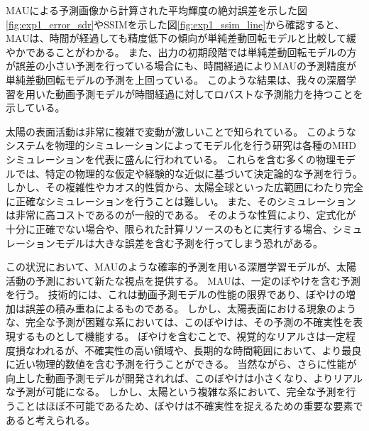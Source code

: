       MAUによる予測画像から計算された平均輝度の絶対誤差を示した図\ref{fig:exp1_error_sdr}やSSIMを示した図\ref{fig:exp1_ssim_line}から確認すると、MAUは、時間が経過しても精度低下の傾向が単純差動回転モデルと比較して緩やかであることがわかる。
      また、出力の初期段階では単純差動回転モデルの方が誤差の小さい予測を行っている場合にも、時間経過によりMAUの予測精度が単純差動回転モデルの予測を上回っている。
      このような結果は、我々の深層学習を用いた動画予測モデルが時間経過に対してロバストな予測能力を持つことを示している。

      太陽の表面活動は非常に複雑で変動が激しいことで知られている。
      このようなシステムを物理的シミュレーションによってモデル化を行う研究は各種のMHDシミュレーションを代表に盛んに行われている。
      これらを含む多くの物理モデルでは、特定の物理的な仮定や経験的な近似に基づいて決定論的な予測を行う。
      しかし、その複雑性やカオス的性質から、太陽全球といった広範囲にわたり完全に正確なシミュレーションを行うことは難しい。
      また、そのシミュレーションは非常に高コストであるのが一般的である。
      そのような性質により、定式化が十分に正確でない場合や、限られた計算リソースのもとに実行する場合、シミュレーションモデルは大きな誤差を含む予測を行ってしまう恐れがある。

      この状況において、MAUのような確率的予測を用いる深層学習モデルが、太陽活動の予測において新たな視点を提供する。
      MAUは、一定のぼやけを含む予測を行う。
      技術的には、これは動画予測モデルの性能の限界であり、ぼやけの増加は誤差の積み重ねによるものである。
      しかし、太陽表面における現象のような、完全な予測が困難な系においては、このぼやけは、その予測の不確実性を表現するものとして機能する。
      ぼやけを含むことで、視覚的なリアルさは一定程度損なわれるが、不確実性の高い領域や、長期的な時間範囲において、より最良に近い物理的数値を含む予測を行うことができる。
      当然ながら、さらに性能が向上した動画予測モデルが開発されれば、このぼやけは小さくなり、よりリアルな予測が可能になる。
      しかし、太陽という複雑な系において、完全な予測を行うことはほぼ不可能であるため、ぼやけは不確実性を捉えるための重要な要素であると考えられる。

